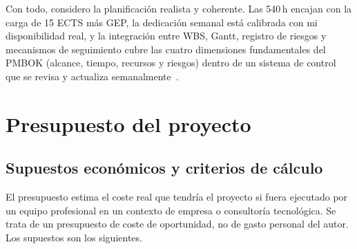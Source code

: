 \documentclass[11pt,a4paper]{article}
\begin{document}
Con todo, considero la planificación realista y coherente. Las 540\,h encajan con la carga de 15 ECTS más GEP, la dedicación semanal está calibrada con mi disponibilidad real, y la integración entre WBS, Gantt, registro de riesgos y mecanismos de seguimiento cubre las cuatro dimensiones fundamentales del PMBOK (alcance, tiempo, recursos y riesgos) dentro de un sistema de control que se revisa y actualiza semanalmente~\cite{gep23,gpi}.


\section{Presupuesto del proyecto}

\subsection{Supuestos económicos y criterios de cálculo}

El presupuesto estima el coste real que tendría el proyecto si fuera ejecutado por un equipo profesional en un contexto de empresa o consultoría tecnológica. Se trata de un presupuesto de coste de oportunidad, no de gasto personal del autor. Los supuestos son los siguientes.
\end{document}
